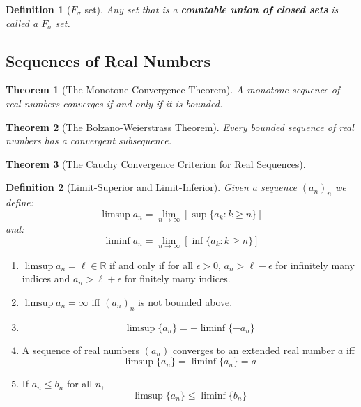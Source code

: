 \documentclass[11pt]{article}
\newtheorem{theorem}{Theorem}[section]
\newtheorem*{definition*}{Definition}
\begin{document}
\begin{definition*}[$F_\sigma$ set]
    Any set that is a \textbf{countable union of closed sets} is called a $F_\sigma$ set.
\end{definition*}

\subsection{Sequences of Real Numbers}
\setcounter{theorem}{14}
\begin{theorem}[The Monotone Convergence Theorem]
    A monotone sequence of real numbers converges if and only if it is bounded.
\end{theorem}

\begin{theorem}[The Bolzano-Weierstrass Theorem]
    Every bounded sequence of real numbers has a convergent subsequence.
\end{theorem}

\begin{theorem}[The Cauchy Convergence Criterion for Real Sequences]
\end{theorem}

\begin{definition*}[Limit-Superior and Limit-Inferior]
    Given a sequence ${(a_n)}_n$ we define:
    \[
        \limsup a_n = \lim_{n \to \infty} [ \sup {\{a_k : k \geq n\}} ]
    \]
    and:
    \[
        \liminf a_n = \lim_{n \to \infty} [ \inf {\{a_k : k \geq n\}} ]
    \]
\end{definition*}

\begin{enumerate}[label= (\roman*), leftmargin=*]
    \item $\limsup a_n = \ell \in \mathbb{R}$ if and only if for all $\epsilon > 0$, $a_n >  \ell - \epsilon$ for infinitely many indices and $a_n > \ell + \epsilon$ for finitely many indices.
    \item $\limsup a_n = \infty$ iff ${(a_n)}_n$ is not bounded above.
    \item \[
              \limsup{\{a_n\}} = -\liminf{\{-a_n\}}
          \]
    \item A sequence of real numbers $(a_n)$ converges to an extended real number $a$ iff
          \[
              \limsup{\{a_n\}} = \liminf{\{a_n\}} = a
          \]
    \item If $a_n \leq b_n$ for all $n$,
          \[
              \limsup {\{a_n\}} \leq \liminf {\{b_n\}}
          \]
\end{enumerate}
\end{document}
